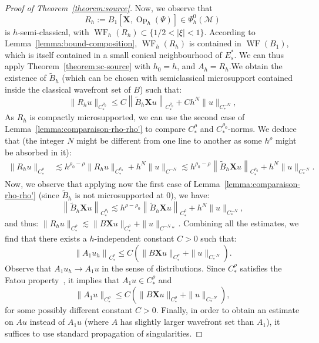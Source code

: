 \documentclass[10pt]{amsart}
\theoremstyle{definition}\newtheorem{defi}[theo]{Definition}\newtheorem{rema}[theo]{Remark}\newtheorem{exam}[theo]{Example}\newtheorem{exem}[theo]{Example}\newtheorem{nota}[theo]{Notation}
\newcommand{\X}{\mathbf{X}}
\newcommand{\M}{\mathcal{M}}
\DeclareMathOperator{\Op}{Op}
\DeclareMathOperator{\WF}{WF}
\begin{document}
\begin{proof}[Proof of Theorem~\ref{theorem:source}]
Now, we observe that
\[
R_{h}:=B_1\left[\X, \Op_{h}(\Psi)\right] \in \Psi^0_{h}(\M)
\]
is $h$-semi-classical, with $\WF_{h}(R_{h}) \subset\{1/2 < |\xi| < 1\}$. According to Lemma~\ref{lemma:bound-composition}, $\WF_h(R_h)$ is contained in $\WF(B_1)$, which is itself contained in a small conical neighbourhood of $E^\ast_s$. We can thus apply Theorem~\ref{theorem:sc-source} with $h_0 = h$, and $A_h = R_h$.\linebreak We obtain the existence of $\widetilde{B}_{h}$ (which can be chosen with semiclassical microsupport contained inside the classical wavefront set of $B$) such that:
\[
\|R_{h}u \|_{C^{\rho_0}_\ast} \leq C \left\| \widetilde{B}_{h} \X u \right\|_{C^{\rho_0}_\ast} + C h^N \|u\|_{C^{-N}_*},
\]
As $R_{h}$ is compactly microsupported, we can use the second case of Lemma~\ref{lemma:comparaison-rho-rho'} to compare $C^\rho_*$ and $C^{\rho_0}_*$-norms. We deduce that (the integer $N$ might be different from one line to another as some $h^\rho$ might be absorbed in it):
\begin{align*}
\|R_{h} u\|_{C^\rho_*} & \lesssim h^{\rho_0-\rho} \|R_{h}u \|_{C^{\rho_0}_*} + h^N\|u\|_{C^{-N}} \lesssim h^{\rho_0-\rho} \left\| \widetilde{B}_{h} \X u \right\|_{C^{\rho_0}_\ast} + h^N \|u\|_{C^{-N}_*}.
\end{align*}
Now, we observe that applying now the first case of Lemma~\ref{lemma:comparaison-rho-rho'} (since $\widetilde{B}_h$ is not microsupported at $0$), we have:
\[
\left\|\widetilde{B}_{h} \X u \right\|_{C^{\rho_0}_\ast} \lesssim h^{\rho-\rho_0} \left\|\widetilde{B}_{h} \X u \right\|_{C^{\rho}_\ast} + h^N \|u\|_{C^{-N}_*},
\]
and thus: $\|R_{h} u\|_{C^\rho_*} \lesssim \|B \X u \|_{C^\rho_*} + \|u\|_{C^{-N}*}$. Combining all the estimates, we find that there exists a $h$-independent constant $C > 0$ such that:
\begin{equation}\label{equation:a1}
\left\|A_1 u_{h} \right\|_{C^{\rho}_\ast} \leq C \left(\|B \X u\|_{C^\rho_*} + \|u\|_{C^{-N}_*}\right).
\end{equation}
Observe that $A_1 u_h \rightarrow A_1 u$ in the sense of distributions. Since $C^\rho_\ast$ satisfies the Fatou property~\cite[Proposition~2, p.~15]{Runst-Sickel-96}, it implies that $A_1 u \in C^\rho_\ast$ and
\[
\|A_1 u\|_{C^{\rho}_\ast} \leq C \left(\|B \X u\|_{C^\rho_*} + \|u\|_{C^{-N}_*}\right),
\]
for some possibly different constant $C > 0$. Finally, in order to obtain an estimate on $Au$ instead of $A_1 u$ (where $A$ has slightly larger wavefront set than $A_1$), it suffices to use standard propagation of singularities.
\end{proof}
\end{document}
